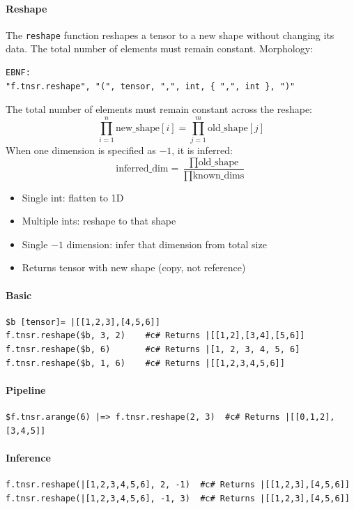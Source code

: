 \paragraph{Reshape}
The \texttt{reshape} function reshapes a tensor to a new shape without changing its data. The total number of elements must remain constant.
Morphology:
\begin{verbatim}
EBNF:
"f.tnsr.reshape", "(", tensor, ",", int, { ",", int }, ")"
\end{verbatim}
The total number of elements must remain constant across the reshape:
\[
\prod_{i=1}^{n} \text{new\_shape}[i] = \prod_{j=1}^{m} \text{old\_shape}[j]
\]
When one dimension is specified as $-1$, it is inferred:
\[
\text{inferred\_dim} = \frac{\prod \text{old\_shape}}{\prod \text{known\_dims}}
\]
\begin{itemize}
\item Single int: flatten to 1D
\item Multiple ints: reshape to that shape
\item Single $-1$ dimension: infer that dimension from total size
\item Returns tensor with new shape (copy, not reference)
\end{itemize}

\paragraph{Basic}
\begin{verbatim}
$b [tensor]= |[[1,2,3],[4,5,6]]
f.tnsr.reshape($b, 3, 2)    #c# Returns |[[1,2],[3,4],[5,6]]
f.tnsr.reshape($b, 6)       #c# Returns |[1, 2, 3, 4, 5, 6]
f.tnsr.reshape($b, 1, 6)    #c# Returns |[[1,2,3,4,5,6]]
\end{verbatim}

\paragraph{Pipeline}
\begin{verbatim}
$f.tnsr.arange(6) |=> f.tnsr.reshape(2, 3)  #c# Returns |[[0,1,2],[3,4,5]]
\end{verbatim}

\paragraph{Inference}
\begin{verbatim}
f.tnsr.reshape(|[1,2,3,4,5,6], 2, -1)  #c# Returns |[[1,2,3],[4,5,6]]
f.tnsr.reshape(|[1,2,3,4,5,6], -1, 3)  #c# Returns |[[1,2,3],[4,5,6]]
\end{verbatim}

